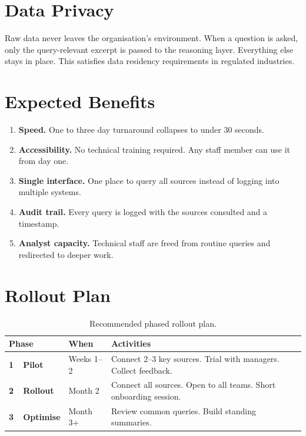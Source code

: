 \documentclass[12pt, a4paper]{article}
\begin{document}
\section*{Data Privacy}

Raw data never leaves the organisation's environment. When a question is asked,
only the query-relevant excerpt is passed to the reasoning layer. Everything else
stays in place. This satisfies data residency requirements in regulated industries.

\section*{Expected Benefits}

\begin{enumerate}
  \item \textbf{Speed.} One to three day turnaround collapses to under 30 seconds.
  \item \textbf{Accessibility.} No technical training required. Any staff member
        can use it from day one.
  \item \textbf{Single interface.} One place to query all sources instead of
        logging into multiple systems.
  \item \textbf{Audit trail.} Every query is logged with the sources consulted
        and a timestamp.
  \item \textbf{Analyst capacity.} Technical staff are freed from routine queries
        and redirected to deeper work.
\end{enumerate}

\section*{Rollout Plan}

\begin{table}[h]
\centering
\begin{tabular}{>{\bfseries}lll}
  \toprule
  Phase & When & Activities \\
  \midrule
  1\ \ Pilot    & Weeks 1--2  & Connect 2--3 key sources. Trial with managers. Collect feedback. \\[4pt]
  2\ \ Rollout  & Month 2     & Connect all sources. Open to all teams. Short onboarding session. \\[4pt]
  3\ \ Optimise & Month 3+    & Review common queries. Build standing summaries. \\
  \bottomrule
\end{tabular}
\caption{Recommended phased rollout plan.}
\end{table}
\end{document}
